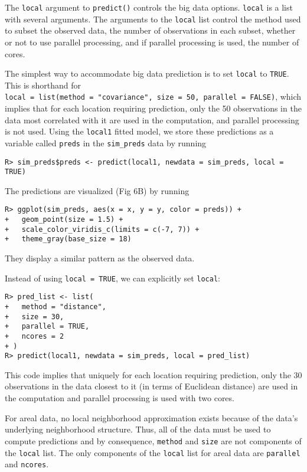 \documentclass[10pt,letterpaper]{article}
\begin{document}
The \texttt{local} argument to \texttt{predict()} controls the big data
options. \texttt{local} is a list with several arguments. The arguments
to the \texttt{local} list control the method used to subset the
observed data, the number of observations in each subset, whether or not
to use parallel processing, and if parallel processing is used, the
number of cores.

The simplest way to accommodate big data prediction is to set
\texttt{local} to \texttt{TRUE}. This is shorthand for
\texttt{local\ =\ list(method\ =\ "covariance",\ size\ =\ 50,\ parallel\ =\ FALSE)},
which implies that for each location requiring prediction, only the 50
observations in the data most correlated with it are used in the
computation, and parallel processing is not used. Using the
\texttt{local1} fitted model, we store these predictions as a variable
called \texttt{preds} in the \texttt{sim\_preds} data by running

\begin{verbatim}
R> sim_preds$preds <- predict(local1, newdata = sim_preds, local = TRUE)
\end{verbatim}

The predictions are visualized (Fig 6B) by running

\begin{verbatim}
R> ggplot(sim_preds, aes(x = x, y = y, color = preds)) +
+   geom_point(size = 1.5) +
+   scale_color_viridis_c(limits = c(-7, 7)) + 
+   theme_gray(base_size = 18)
\end{verbatim}

They display a similar pattern as the observed data.

Instead of using \texttt{local\ =\ TRUE}, we can explicitly set
\texttt{local}:

\begin{verbatim}
R> pred_list <- list(
+   method = "distance",
+   size = 30,
+   parallel = TRUE,
+   ncores = 2
+ )
R> predict(local1, newdata = sim_preds, local = pred_list)
\end{verbatim}

This code implies that uniquely for each location requiring prediction,
only the 30 observations in the data closest to it (in terms of
Euclidean distance) are used in the computation and parallel processing
is used with two cores.

For areal data, no local neighborhood approximation exists because of
the data's underlying neighborhood structure. Thus, all of the data must
be used to compute predictions and by consequence, \texttt{method} and
\texttt{size} are not components of the \texttt{local} list. The only
components of the \texttt{local} list for areal data are
\texttt{parallel} and \texttt{ncores}.
\end{document}
